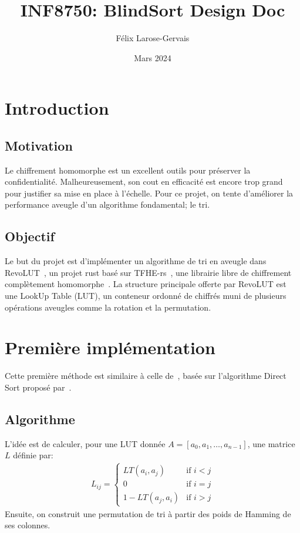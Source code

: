 \documentclass{article}
\title{INF8750: BlindSort Design Doc}
\author{Félix Larose-Gervais}
\date{Mars 2024}
\begin{document}
\maketitle
\tableofcontents

\section{Introduction}

\subsection{Motivation}

Le chiffrement homomorphe est un excellent outils pour préserver la confidentialité. Malheureusement, son cout en efficacité est encore trop grand pour justifier sa mise en place à l'échelle. Pour ce projet, on tente d'améliorer la performance aveugle d'un algorithme fondamental; le tri.

\subsection{Objectif}

Le but du projet est d'implémenter un algorithme de tri en aveugle dans RevoLUT~\cite{RevoLUT}, un projet rust basé sur TFHE-rs~\cite{TFHE-rs}, une librairie libre de chiffrement complètement homomorphe~\cite{marcolla_survey_2022}. La structure principale offerte par RevoLUT est une LookUp Table (LUT), un conteneur ordonné de chiffrés muni de plusieurs opérations aveugles comme la rotation et la permutation.

\newpage

\section{Première implémentation}

Cette première méthode est similaire à celle de~\cite{iliashenko_faster_2021}, basée sur l'algorithme Direct Sort proposé par~\cite{lauter_depth_2015}.

\subsection{Algorithme}

L'idée est de calculer, pour une LUT donnée $A = [a_0, a_1, \dots, a_{n-1}]$, une matrice $L$ définie par:
\begin{align*}
    L_{ij} = \begin{cases}
        LT(a_i, a_j) & \text{if } i < j \\
        0 & \text{if } i = j \\
        1 - LT(a_j, a_i) & \text{if } i > j 
    \end{cases}
\end{align*}
Ensuite, on construit une permutation de tri à partir des poids de Hamming de ses colonnes.
\end{document}
